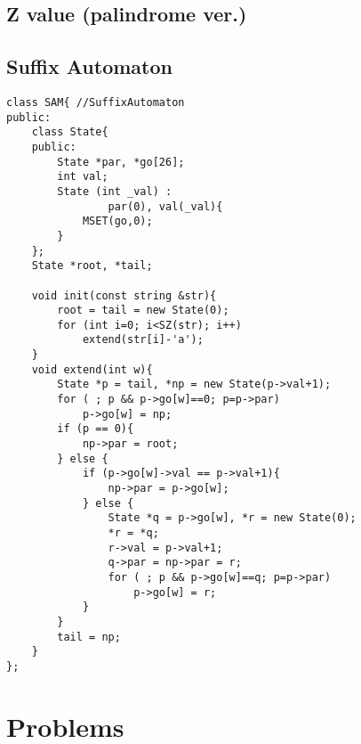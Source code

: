 \documentclass[10pt,twocolumn,oneside]{article}
\begin{document}
\subsection{Z value (palindrome ver.)}


\subsection{Suffix Automaton}
\begin{lstlisting}
class SAM{ //SuffixAutomaton
public:
	class State{
	public:
		State *par, *go[26];
		int val;
		State (int _val) : 
				par(0), val(_val){
			MSET(go,0);
		}
	};
	State *root, *tail;
	
	void init(const string &str){
		root = tail = new State(0);
		for (int i=0; i<SZ(str); i++)
			extend(str[i]-'a');
	}
	void extend(int w){
		State *p = tail, *np = new State(p->val+1);
		for ( ; p && p->go[w]==0; p=p->par)
			p->go[w] = np;
		if (p == 0){
			np->par = root;
		} else {
			if (p->go[w]->val == p->val+1){
				np->par = p->go[w];
			} else {
				State *q = p->go[w], *r = new State(0);
				*r = *q;
				r->val = p->val+1;
				q->par = np->par = r;
				for ( ; p && p->go[w]==q; p=p->par)
					p->go[w] = r;
			}
		}
		tail = np;
	}
};
\end{lstlisting}
\newpage
\section{Problems}
\end{document}
